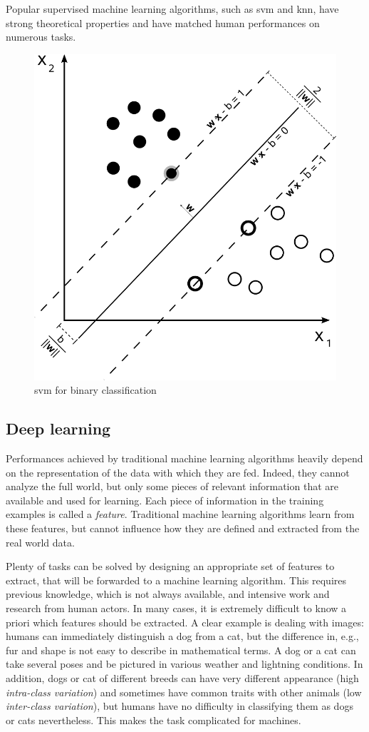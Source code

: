 \documentclass[%
    corpo=12pt,
    twoside,
    stile=classica,   
    tipotesi=magistrale,
    evenboxes,
    english,
	numerazioneromana,
]{toptesi}
\begin{document}
Popular supervised machine learning algorithms, such as \gls{svm} and \gls{knn}, have strong theoretical properties and have matched human performances on numerous tasks.

\begin{figure}[ht]
	\centering
	\includegraphics[width=.45\linewidth]{imgs/svm.png}
	\caption{\Gls{svm} for binary classification}
	\label{fig:supervised}
\end{figure}

\subsection{Deep learning}
Performances achieved by traditional machine learning algorithms heavily depend on the representation of the data with which they are fed. Indeed, they cannot analyze the full world, but only some pieces of relevant information that are available and used for learning. Each piece of information in the training examples is called a \textit{feature}. Traditional machine learning algorithms learn from these features, but cannot influence how they are defined and extracted from the real world data.

\medskip
Plenty of tasks can be solved by designing an appropriate set of features to extract, that will be forwarded to a machine learning algorithm. This requires previous knowledge, which is not always available, and intensive work and research from human actors. In many cases, it is extremely difficult to know a priori which features should be extracted. A clear example is dealing with images: humans can immediately distinguish a dog from a cat, but the difference in, e.g., fur and shape is not easy to describe in mathematical terms. A dog or a cat can take several poses and be pictured in various weather and lightning conditions. In addition, dogs or cat of different breeds can have very different appearance (high \textit{intra-class variation}) and sometimes have common traits with other animals (low \textit{inter-class variation}), but humans have no difficulty in classifying them as dogs or cats nevertheless. This makes the task complicated for machines.
\end{document}
